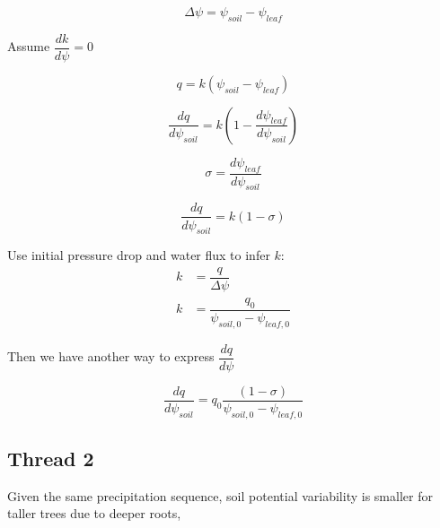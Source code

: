\documentclass[11pt]{article}
\begin{document}
\begin{equation}
\Delta{\psi} = \psi_{soil}-\psi_{leaf}
\end{equation}

Assume $\dfrac{dk}{d\psi}=0$

\begin{equation}
q = k\left(\psi_{soil}-\psi_{leaf}\right)
\end{equation}

\begin{equation}
\dfrac{dq}{d\psi_{soil}} = k\left(1-\dfrac{d\psi_{leaf}}{d\psi_{soil}} \right)
\end{equation}

\begin{equation}
\sigma = \dfrac{d\psi_{leaf}}{d\psi_{soil}}
\end{equation}

\begin{equation}
\dfrac{dq}{d\psi_{soil}} = k\left(1-\sigma \right)
\end{equation}

Use initial pressure drop and water flux to infer $k$:
\begin{equation}
\begin{aligned}
k&=\dfrac{q}{\Delta{\psi}} \\
k&=\dfrac{q_0}{\psi_{soil,0}-\psi_{leaf,0}}
\end{aligned}
\end{equation}

Then we have another way to express $\dfrac{dq}{d\psi}$

\begin{equation}
\dfrac{dq}{d\psi_{soil}} = q_0\dfrac{\left(1-\sigma \right)}{\psi_{soil,0}-\psi_{leaf,0}}
\end{equation}




\subsection{Thread 2}
Given the same precipitation sequence, soil potential variability is smaller for taller trees due to deeper roots, 
\end{document}

